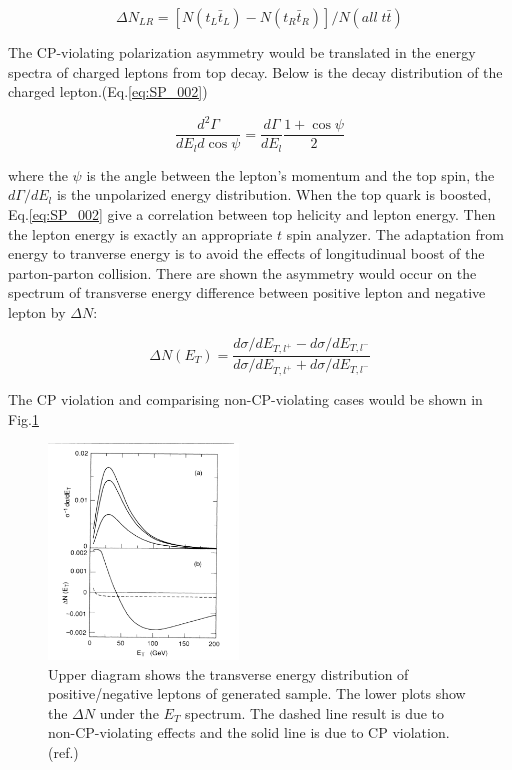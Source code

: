 			\begin{equation}
			\Delta N_{LR} = [N(t_L \bar{t}_L)-N(t_R \bar{t}_R)]/N(all \; t\bar{t})
			\label{eq:SP_001}
			\end{equation}

			The CP-violating polarization asymmetry would be translated in the energy spectra of charged leptons from top decay. Below is the decay distribution of the charged lepton.(Eq.\ref{eq:SP_002})
			
			\begin{equation}
			\frac{d^2 \Gamma}{d E_l d \cos{\psi}} = \frac{d \Gamma}{d E_l} \frac{ 1 + \cos{\psi}}{2} 
			\label{eq:SP_002}
			\end{equation}

			where the $\psi$ is the angle between the lepton's momentum and the top spin, the $d\Gamma/dE_l$ is the unpolarized energy distribution. When the top quark is boosted, Eq.\ref{eq:SP_002} give a correlation between top helicity and lepton energy. Then the lepton energy is exactly an appropriate $t$ spin analyzer. The adaptation from energy to tranverse energy is to avoid the effects of longitudinual boost of the parton-parton collision. There are shown the asymmetry would occur on the spectrum of transverse energy difference between positive lepton and negative lepton by $\Delta N$:

			\begin{equation}
			\Delta N(E_T) = \frac{d\sigma/dE_{T,l^{+}} - d\sigma/dE_{T,l^{-}}}{d\sigma/dE_{T,l^{+}} + d\sigma/dE_{T,l^{-}}}
			\label{eq:SP_003}
			\end{equation}

			The CP violation and comparising non-CP-violating cases would be shown in Fig.\ref{Obs:fig:SP_ex}

			\begin{figure}[H]
			\centering
			    \includegraphics[width=0.45\textwidth]{Figures/Observables/SchmidPeskin.png}
			\caption{Upper diagram shows the transverse energy distribution of positive/negative leptons of generated sample. The lower plots show the $\Delta N$ under the $E_T$ spectrum. The dashed line result is due to non-CP-violating effects and the solid line is due to CP violation.(ref.\cite{PhysRevLett.69.410})}
			\label{Obs:fig:SP_ex}
			\end{figure}
			\FloatBarrier

